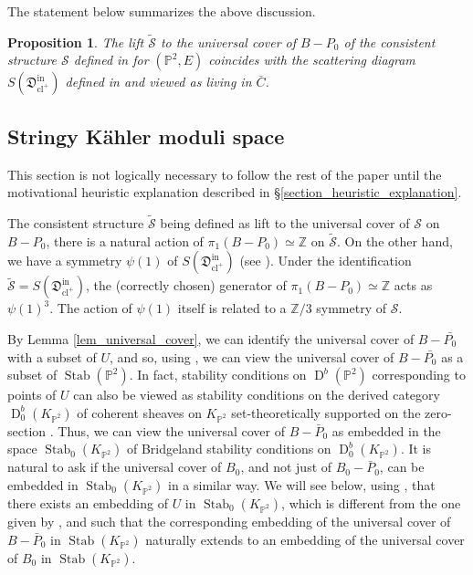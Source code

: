 \documentclass[11pt,letterpaper]{amsart}
\newtheorem{prop}[defn]{Proposition}
\newcommand\PP{\mathbb P}
\newcommand\Z{\mathbb Z}
\newcommand\fD{\mathfrak D}
\newcommand\cl{\operatorname{cl}}
\newcommand\Stab{\operatorname{Stab}}
\newcommand\D{\operatorname{D}}
\newcommand\iin{\mathrm{in}}
\begin{document}
The statement below summarizes the above discussion.

\begin{prop} \label{prop_comparing_scatterings}
The lift $\tilde{\mathcal{S}}$ to the universal cover of 
$B-P_0$ of the consistent structure $\mathcal{S}$ defined in \cite{cps}
for $(\PP^2,E)$ coincides with the scattering diagram 
$S(\fD^{\iin}_{\cl^+})$ defined in \cite{bousseau2019scattering}
and viewed as living in $\bar{C}$.
\end{prop}

\subsection{Stringy K\"ahler moduli space} \label{section_stringy_kahler}
This section is not logically necessary to follow the rest of the paper until the 
motivational heuristic explanation described in \S \ref{section_heuristic_explanation}.

The consistent structure
$\tilde{\mathcal{S}}$ being defined as lift to the universal cover of $\mathcal{S}$ on $B-P_0$, there is a natural action of $\pi_1(B-P_0) \simeq \Z$ on $\tilde{\mathcal{S}}$. On the other hand, we have a symmetry $\psi(1)$ of $S(\fD^\iin_{\cl^+})$ (see \cite[\S 1.5]{bousseau2019scattering}). Under the identification $\tilde{\mathcal{S}}
=S(\fD^\iin_{\cl^+})$, the (correctly chosen) generator of $\pi_1(B-P_0) \simeq \Z$ acts as $\psi(1)^3$. The action of $\psi(1)$ itself is related to a $\Z/3$ symmetry of $\mathcal{S}$.

By Lemma \ref{lem_universal_cover}, we can identify the universal cover of $B-\bar{P_0}$ with a subset of $U$, and so, using  
\cite[Proposition 2.14]{bousseau2019scattering}, we can view the universal cover of $B-\bar{P_0}$ as a subset of $\Stab(\PP^2)$. 
In fact, stability conditions on 
$\D^b(\PP^2)$ corresponding to points of $U$ can also be viewed as stability conditions on the derived category $\D^b_0(K_{\PP^2})$ of coherent sheaves on $K_{\PP^2}$
set-theoretically supported on the zero-section \cite{MR2852118}. Thus, we can view the universal cover of $B-\bar{P}_0$
as embedded in the space $\Stab_0(K_{\PP^2})$ of Bridgeland stability conditions on 
$\D^b_0(K_{\PP^2})$. 
It is natural to ask if the universal cover of $B_0$, and not just of 
$B_0-\bar{P}_0$, can be embedded in $\Stab_0(K_{\PP^2})$ in a similar way. 
We will see below, using \cite[\S 9]{MR2852118}, that there exists an embedding
of $U$ in $\Stab_0(K_{\PP^2})$, which is different from the one given by
\cite[Proposition 2.14]{bousseau2019scattering}, and such that the corresponding embedding 
of the universal cover of $B-\bar{P}_0$ in 
$\Stab(K_{\PP^2})$ naturally extends to an embedding of the universal cover of
$B_0$ in $\Stab(K_{\PP^2})$. 
\end{document}
